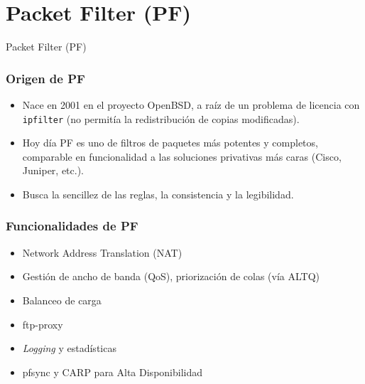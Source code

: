 \documentclass{beamer}
\begin{document}
\section{Packet Filter (PF)}

\begin{frame}

\begin{center}
\huge{Packet Filter (PF)}
\end{center}

\end{frame}


\begin{frame}
\frametitle{Origen de PF}

\begin{itemize}
\item Nace en 2001 en el proyecto OpenBSD, a raíz de un problema de licencia con \texttt{ipfilter} (no permitía la redistribución de copias modificadas).
\item Hoy día PF es uno de filtros de paquetes más potentes y completos, comparable en funcionalidad a las soluciones privativas más caras (Cisco, Juniper, etc.).
\item Busca la sencillez de las reglas, la consistencia y la legibilidad.
  \end{itemize}

\end{frame}


\begin{frame}
\frametitle{Funcionalidades de PF}

\begin{itemize}
\item Network Address Translation (NAT) 
\item Gestión de ancho de banda (QoS), priorización de colas (vía ALTQ)
\item Balanceo de carga
\item ftp-proxy  
\item \textit{Logging} y estadísticas
\item pfsync y CARP para Alta Disponibilidad
\end{itemize}

\end{frame}
\end{document}
